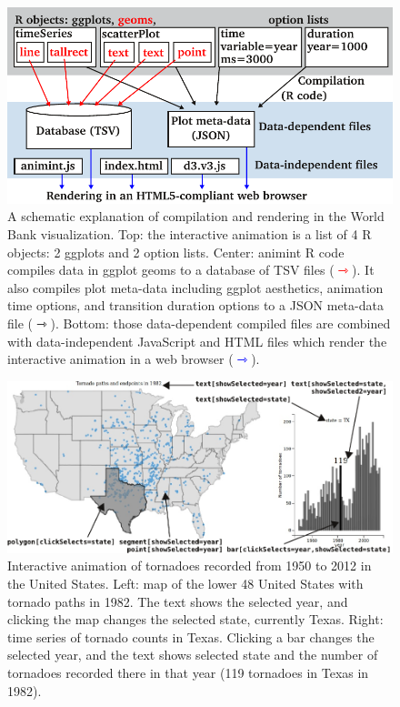 \documentclass[12pt,]{article}
\theoremstyle{definition}
\theoremstyle{definition}
\theoremstyle{remark}
\begin{document}
\begin{figure}
\centering
\includegraphics{images/figure-design.pdf}
\caption{\label{fig:design}A schematic explanation of compilation and
rendering in the World Bank visualization. Top: the interactive
animation is a list of 4 R objects: 2 ggplots and 2 option lists.
Center: animint R code compiles data in ggplot geoms to a database of
TSV files (\textcolor{red}{$\rightarrowtriangle$}). It also compiles
plot meta-data including ggplot aesthetics, animation time options, and
transition duration options to a JSON meta-data file
(\(\rightarrowtriangle\)). Bottom: those data-dependent compiled files
are combined with data-independent JavaScript and HTML files which
render the interactive animation in a web browser
(\textcolor{blue}{$\rightarrowtriangle$}).}
\end{figure}

\begin{figure}
\centering
\includegraphics{images/figure-tornado.pdf}
\caption{\label{fig:tornado}Interactive animation of tornadoes recorded from
1950 to 2012 in the United States. Left: map of the lower 48 United
States with tornado paths in 1982. The text shows the selected year, and
clicking the map changes the selected state, currently Texas. Right:
time series of tornado counts in Texas. Clicking a bar changes the
selected year, and the text shows selected state and the number of
tornadoes recorded there in that year (119 tornadoes in Texas in 1982).}
\end{figure}
\end{document}

